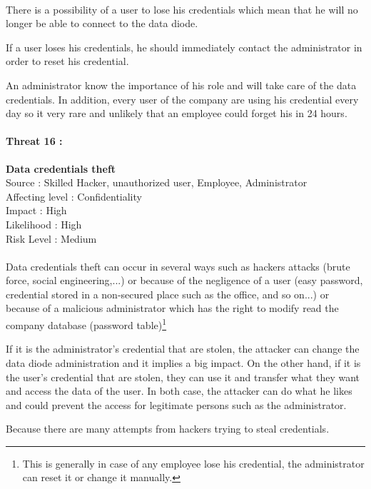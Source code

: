 \documentclass[a4paper,10pt]{article}
\begin{document}
\paragraph{}There is a possibility of a user to lose his credentials which mean that he will no longer be able to connect to the data diode.

If a user loses his credentials, he should immediately contact the administrator in order to reset his credential.

An administrator know the importance of his role and will take care of the data credentials. In addition, every user of the company are using his credential every day so it very rare and unlikely that an employee could forget his in 24 hours. \\

\paragraph{Threat 16 :} \textbf{Data credentials theft} \\ 
Source : Skilled Hacker, unauthorized user, Employee, Administrator \\
Affecting level : Confidentiality \\
Impact : High \\
Likelihood : High \\
Risk Level : Medium
\paragraph{}Data credentials theft can occur in several ways such as hackers attacks (brute force, social engineering,...)  or because of the negligence of a user (easy password, credential stored in a non-secured place such as the office, and so on...) or because of a malicious administrator which has the right to modify  read the company database (password table)\footnote{This is generally in case of any employee lose his credential, the administrator can reset it or change it manually.}

If it is the administrator's credential that are stolen, the attacker can change the data diode administration and it implies a big impact. On the other hand, if it is the user's credential that are stolen, they can use it and transfer what they want and access the data of the user. In both case, the attacker can do what he likes and could prevent the access for legitimate persons such as the administrator. 

Because there are many attempts from hackers trying to steal credentials.\\
\end{document}
